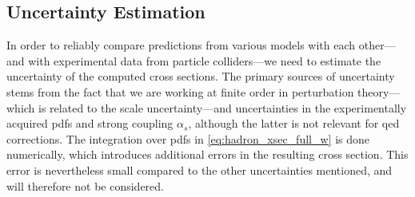 

\subsection{Uncertainty Estimation}\label{sec:uncertainties}

In order to reliably compare predictions from various models with each other---and with experimental data from particle colliders---we need to estimate the uncertainty of the computed cross sections.
The primary sources of uncertainty stems from the fact that we are working at finite order in perturbation theory---which is related to the scale uncertainty---and uncertainties in the experimentally acquired \glspl{pdf} and strong coupling $\alpha_s$, although the latter is not relevant for \gls{qed} corrections.
The integration over \glspl{pdf} in \cref{eq:hadron_xsec_full_w} is done numerically, which introduces additional errors in the resulting cross section. This error is nevertheless small compared to the other uncertainties mentioned, and will therefore not be considered.


